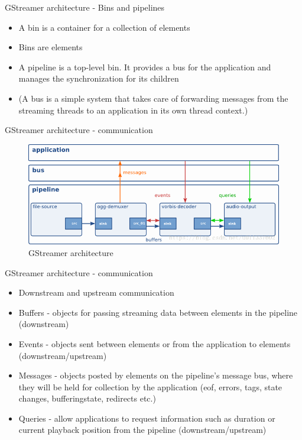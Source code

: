 \documentclass{beamer}
\begin{document}
\begin{frame}{GStreamer architecture - Bins and pipelines}
\begin{itemize}
  \item A bin is a container for a collection of elements
  \item Bins are elements
  \item A pipeline is a top-level bin. It provides a bus for the application and manages the synchronization for its children
  \item (A bus is a simple system that takes care of forwarding messages from the streaming threads to an application in its own thread context.)
\end{itemize}
\end{frame}

\begin{frame}{GStreamer architecture - communication}
  \begin{figure}
    \includegraphics[width=1\textwidth]{gst-comm.png}
    \caption{GStreamer architecture}
  \end{figure}
\end{frame}

\begin{frame}{GStreamer architecture - communication}
\begin{itemize}
  \item Downstream and upstream communication
  \item Buffers - objects for passing streaming data between elements in the pipeline (downstream)
  \item Events - objects sent between elements or from the application to elements (downstream/upstream)
  \item Messages - objects posted by elements on the pipeline's message bus, where they will be held for collection by the application (eof, errors, tags, state changes, bufferingstate, redirects etc.)
  \item Queries - allow applications to request information such as duration or current playback position from the pipeline (downstream/upstream)
\end{itemize}
\end{frame}
\end{document}
